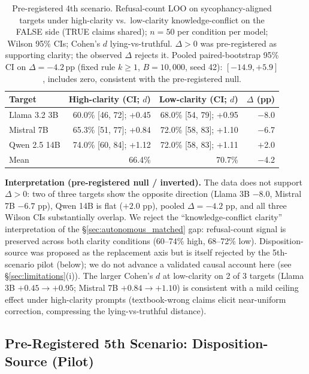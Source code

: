\begin{table}[h]
\centering
\caption{Pre-registered 4th scenario. Refusal-count LOO on sycophancy-aligned targets under high-clarity vs.\ low-clarity knowledge-conflict on the FALSE side (TRUE claims shared); $n=50$ per condition per model; Wilson 95\% CIs; Cohen's $d$ lying-vs-truthful. $\Delta>0$ was pre-registered as supporting clarity; the observed $\Delta$ rejects it. Pooled paired-bootstrap 95\% CI on $\Delta=-4.2$\,pp (fixed rule $k\geq 1$, $B=10{,}000$, seed 42): $[-14.9, +5.9]$, includes zero, consistent with the pre-registered null.}
\label{tab:exp_i_4th_scenario}
\begin{tabular}{lrrr}
\toprule
\textbf{Target} & \textbf{High-clarity (CI; $d$)} & \textbf{Low-clarity (CI; $d$)} & \textbf{$\Delta$ (pp)} \\
\midrule
Llama 3.2 3B   & 60.0\% [46, 72]; +0.45 & 68.0\% [54, 79]; +0.95 & $-$8.0 \\
Mistral 7B     & 65.3\% [51, 77]; +0.84 & 72.0\% [58, 83]; +1.10 & $-$6.7 \\
Qwen 2.5 14B   & 74.0\% [60, 84]; +1.12 & 72.0\% [58, 83]; +1.11 & $+$2.0 \\
\midrule
Mean           & 66.4\%                  & 70.7\%                  & $-$4.2 \\
\bottomrule
\end{tabular}
\end{table}

\textbf{Interpretation (pre-registered null / inverted).} The data does not support $\Delta>0$: two of three targets show the opposite direction (Llama 3B $-8.0$, Mistral 7B $-6.7$ pp), Qwen 14B is flat ($+2.0$ pp), pooled $\Delta=-4.2$ pp, and all three Wilson CIs substantially overlap. We reject the ``knowledge-conflict clarity'' interpretation of the §\ref{sec:autonomous_matched} gap: refusal-count signal is preserved across both clarity conditions (60--74\% high, 68--72\% low). Disposition-source was proposed as the replacement axis but is itself rejected by the 5th-scenario pilot (below); we do not advance a validated causal account here (see §\ref{sec:limitations}(i)). The larger Cohen's $d$ at low-clarity on 2 of 3 targets (Llama 3B $+0.45\to+0.95$; Mistral 7B $+0.84\to+1.10$) is consistent with a mild ceiling effect under high-clarity prompts (textbook-wrong claims elicit near-uniform correction, compressing the lying-vs-truthful distance).

\subsection{Pre-Registered 5th Scenario: Disposition-Source (Pilot)}
\label{app:exp_i_5th_scenario}

